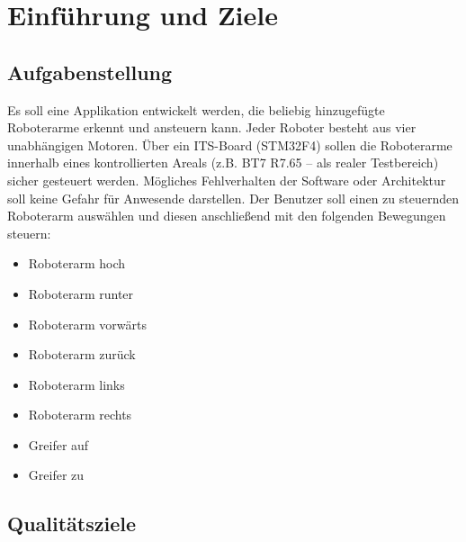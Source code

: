 \chapter{Einführung und Ziele}

\section{Aufgabenstellung}

Es soll eine Applikation entwickelt werden, die beliebig hinzugefügte Roboterarme erkennt und ansteuern kann. Jeder Roboter besteht aus vier unabhängigen Motoren. Über ein ITS-Board (STM32F4) sollen die Roboterarme innerhalb eines kontrollierten Areals (z.B. BT7 R7.65 – als realer Testbereich) sicher gesteuert werden. Mögliches Fehlverhalten der Software oder Architektur soll keine Gefahr für Anwesende darstellen. Der Benutzer soll einen zu steuernden Roboterarm auswählen und diesen anschließend mit den folgenden Bewegungen steuern:

\begin{itemize}
	\item Roboterarm hoch
	\item Roboterarm runter
	\item Roboterarm vorwärts
	\item Roboterarm zurück
	\item Roboterarm links
	\item Roboterarm rechts
	\item Greifer auf
	\item Greifer zu
	
\end{itemize}


\newpage
\section{Qualitätsziele}


